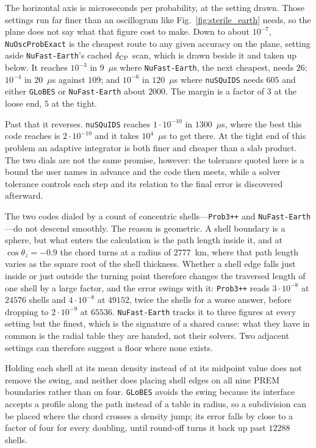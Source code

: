 \documentclass[final,5p,times,twocolumn,sort,compress]{elsarticle}
\newcommand{\fig}{Fig.}
\newcommand{\figu}[1]{\fig~\ref{fig:#1}}
\begin{document}
The horizontal axis is microseconds per probability, at the setting drawn.  Those settings run far finer than an oscillogram like \figu{sterile_earth} needs, so the plane does not say what that figure cost to make.  Down to about $10^{-7}$, {\tt NuOscProbExact} is the cheapest route to any given accuracy on the plane, setting aside {\tt NuFast-Earth}'s cached $\delta_{\rm CP}$ scan, which is drawn beside it and taken up below.  It reaches $10^{-3}$ in $9$~$\mu$s where {\tt NuFast-Earth}, the next cheapest, needs $26$; $10^{-4}$ in $20$~$\mu$s against $109$; and $10^{-6}$ in $120$~$\mu$s where {\tt nuSQuIDS} needs $605$ and either {\tt GLoBES} or {\tt NuFast-Earth} about $2000$.  The margin is a factor of $3$ at the loose end, $5$ at the tight.

Past that it reverses.  {\tt nuSQuIDS} reaches $1 \cdot 10^{-10}$ in $1300$~$\mu$s, where the best this code reaches is $2 \cdot 10^{-10}$ and it takes $10^{4}$~$\mu$s to get there.  At the tight end of this problem an adaptive integrator is both finer and cheaper than a slab product.  The two dials are not the same promise, however: the tolerance quoted here is a bound the user names in advance and the code then meets, while a solver tolerance controls each step and its relation to the final error is discovered afterward.

The two codes dialed by a count of concentric shells---{\tt Prob3++} and {\tt NuFast-Earth}---do not descend smoothly.  The reason is geometric.  A shell boundary is a sphere, but what enters the calculation is the path length inside it, and at $\cos\theta_z = -0.9$ the chord turns at a radius of $2777$~km, where that path length varies as the square root of the shell thickness.  Whether a shell edge falls just inside or just outside the turning point therefore changes the traversed length of one shell by a large factor, and the error swings with it: {\tt Prob3++} reads $3 \cdot 10^{-8}$ at $24576$ shells and $4 \cdot 10^{-8}$ at $49152$, twice the shells for a worse answer, before dropping to $2 \cdot 10^{-9}$ at $65536$.  {\tt NuFast-Earth} tracks it to three figures at every setting but the finest, which is the signature of a shared cause: what they have in common is the radial table they are handed, not their solvers.  Two adjacent settings can therefore suggest a floor where none exists.

Holding each shell at its mean density instead of at its midpoint value does not remove the swing, and neither does placing shell edges on all nine PREM boundaries rather than on four.  {\tt GLoBES} avoids the swing because its interface accepts a profile along the path instead of a table in radius, so a subdivision can be placed where the chord crosses a density jump; its error falls by close to a factor of four for every doubling, until round-off turns it back up past $12288$ shells.
\end{document}
